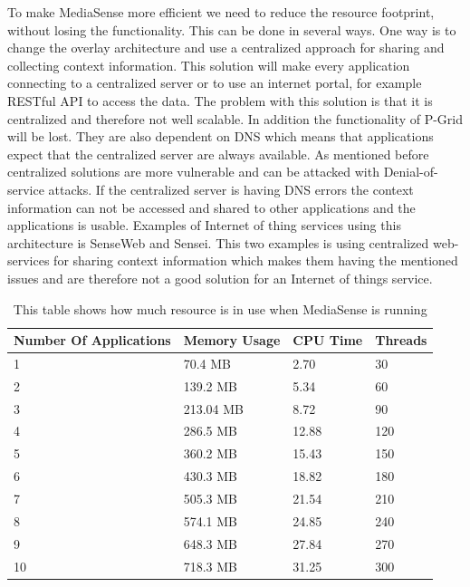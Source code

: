 To make MediaSense more efficient we need to reduce the resource footprint, without losing  the functionality. This can be done in several ways. One way is to change the overlay architecture and use a centralized approach for sharing and collecting context information. This solution will make every application connecting to a centralized server or to use an internet portal, for example RESTful API to access the data. The problem with this solution is that it is centralized and therefore not well scalable. In addition the functionality of P-Grid will be lost. They are also dependent on DNS which means that applications expect that the centralized server are always available. As mentioned before centralized solutions are more vulnerable and can be attacked with Denial-of-service attacks. If the centralized server is having DNS errors the context information can not be accessed and shared to other applications and the applications is usable. Examples of Internet of thing services using this architecture is SenseWeb and Sensei. This two examples is using centralized web-services for sharing context information which makes them having the mentioned issues and are therefore not a good solution for an Internet of things service.

\begin{center}
\begin{table}
    \begin{tabularx}{\textwidth}{ |X|X|X|X| }
    \hline
    Number Of Applications 								& Memory Usage 									& CPU Time							& Threads\\ \hline
    1 													& 70.4 MB 										& 2.70 								& 30 \\ \hline
    2 													& 139.2 MB										& 5.34 								& 60 \\ \hline
    3 													& 213.04 MB										& 8.72 								& 90 \\ \hline
    4 													& 286.5 MB										& 12.88 							& 120 \\ \hline
    5													& 360.2 MB										& 15.43  							& 150 \\ \hline
    6													& 430.3 MB										& 18.82  							& 180 \\ \hline	
    7													& 505.3 MB										& 21.54  							& 210 \\ \hline
    8													& 574.1 MB										& 24.85  							& 240 \\ \hline
    9													& 648.3 MB										& 27.84	  							& 270 \\ \hline
    10													& 718.3 MB										& 31.25  							& 300 \\ \hline
    \end{tabularx}
   	\caption{This table shows how much resource is in use when MediaSense is running}
	\label{tab:test_table}
\end{table}
\end{center}